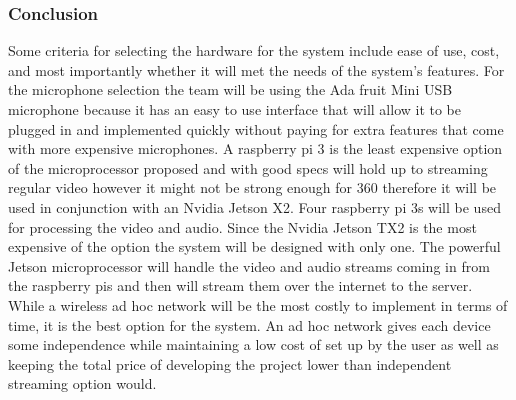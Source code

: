 \documentclass[onecolumn, draftclsnofoot,10pt, compsoc]{IEEEtran}
\begin{document}
        \subsubsection{Conclusion}
        Some criteria for selecting the hardware for the system include ease of use, cost, and most importantly whether it will met the needs of the system's features. For the microphone selection the team will be using the Ada fruit Mini USB microphone because it has an easy to use interface that will allow it to be plugged in and implemented quickly without paying for extra features that come with more expensive microphones. A raspberry pi 3 is the least expensive option of the microprocessor proposed and with good specs will hold up to streaming regular video however it might not be strong enough for 360 therefore it will be used in conjunction with an Nvidia Jetson X2. Four raspberry pi 3s will be used for processing the video and audio. Since the Nvidia Jetson TX2 is the most expensive of the option the system will be designed with only one. The powerful Jetson microprocessor will handle the video and audio streams coming in from the raspberry pis and then will stream them over the internet to the server. While a wireless ad hoc network will be the most costly to implement in terms of time, it is the best option for the system. An ad hoc network gives each device some independence while maintaining a low cost of set up by the user as well as keeping the total price of developing the project lower than independent streaming option would.\\
\end{document}
